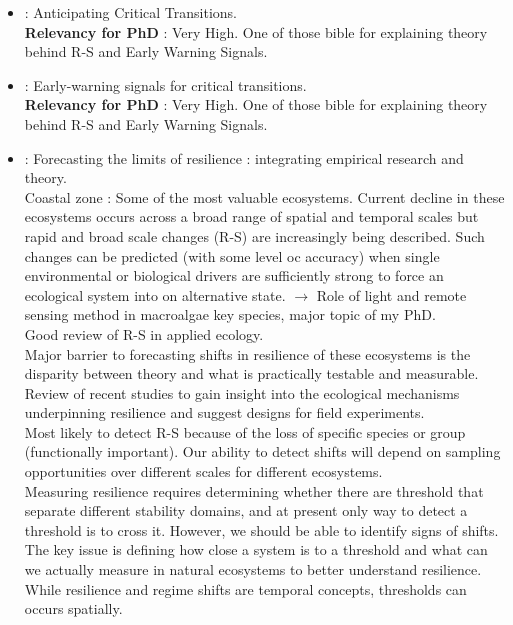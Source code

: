 \documentclass[]{report}
\begin{document}
\begin{itemize}
		\item \cite{scheffer2012anticipating} : Anticipating Critical Transitions.
		\\\textbf{Relevancy for PhD} : Very High. One of those bible for explaining theory behind R-S and Early Warning Signals.
		\item \cite{scheffer2009early} : Early-warning signals for critical transitions.
		\\\textbf{Relevancy for PhD} : Very High. One of those bible for explaining theory behind R-S and Early Warning Signals.
		\item \cite{thrush2009forecasting} : Forecasting the limits of resilience : integrating empirical research and theory.
		\\ Coastal zone : Some of the most valuable ecosystems. Current decline in these ecosystems occurs across a broad range of spatial and temporal scales but rapid and broad scale changes (R-S) are increasingly being described. Such changes can be predicted (with some level oc accuracy) when single environmental or biological drivers are sufficiently strong to force an ecological system into on alternative state. $\rightarrow$ Role of light and remote sensing method in macroalgae key species, major topic of my PhD.
		\\Good review of R-S in applied ecology.
		\\Major barrier to forecasting shifts in resilience of these ecosystems is the disparity between theory and what is practically testable and measurable.
		\\ Review of recent studies to gain insight into the ecological mechanisms underpinning resilience and suggest designs for field experiments.
		\\ Most likely to detect R-S because of the loss of specific species or group (functionally important). Our ability to detect shifts will depend on sampling opportunities over different scales for different ecosystems.
		\\Measuring resilience requires determining whether there are threshold that separate different stability domains, and at present only way to detect a threshold is to cross it. However, we should be able to identify signs of shifts.
		\\ The key issue is defining how close a system is to a threshold and what can we actually measure in natural ecosystems to better understand resilience.
		\\ While resilience and regime shifts are temporal concepts, thresholds can occurs spatially.

\end{itemize}
\end{document}
